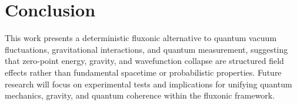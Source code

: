 \documentclass{article}
\begin{document}
\section{Conclusion}
This work presents a deterministic fluxonic alternative to quantum vacuum fluctuations, gravitational interactions, and quantum measurement, suggesting that zero-point energy, gravity, and wavefunction collapse are structured field effects rather than fundamental spacetime or probabilistic properties. Future research will focus on experimental tests and implications for unifying quantum mechanics, gravity, and quantum coherence within the fluxonic framework.
\end{document}

